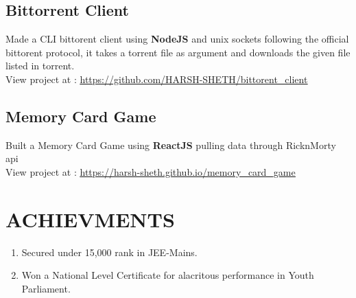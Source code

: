 \documentclass[12pt]{article}
\begin{document}
\subsection*{Bittorrent Client}
\parbox{\textwidth}{ Made a CLI bittorent client using \textbf{NodeJS} and unix sockets following the official bittorent protocol, it takes a torrent file as argument and downloads the given file listed in torrent. 
\\ View project at : \underline{\url{https://github.com/HARSH-SHETH/bittorent_client}}
}

\subsection*{Memory Card Game}
\parbox{\textwidth}{ Built a Memory Card Game using \textbf{ReactJS} pulling data through RicknMorty api
\\ View project at : \underline{\url{https://harsh-sheth.github.io/memory_card_game}}
}
\section{ACHIEVMENTS}
\begin{enumerate}
  \item Secured under 15,000 rank in JEE-Mains.
  \item Won a National Level Certificate for alacritous performance in Youth Parliament.
\end{enumerate}

\end{document}
